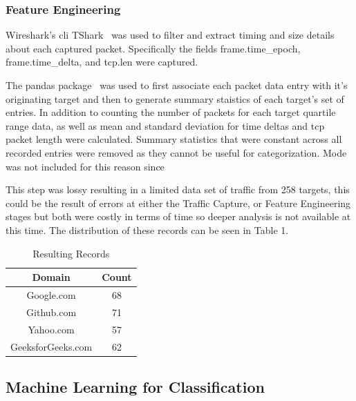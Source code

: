 \documentclass[10pt,sigconf,letterpaper,nonacm]{acmart}
\begin{document}
\subsubsection{Feature Engineering} Wireshark's cli TShark~\cite{Wireshark} was used to
filter and extract timing and size details about each captured packet. Specifically the
fields frame.time\_epoch, frame.time\_delta, and tcp.len were captured.
\par The pandas package~\cite{pandas} was used to first associate each packet data entry
with it's originating target and then to generate summary staistics of each target's set
of entries. In addition to counting the number of packets for each target quartile range
data, as well as mean and standard deviation for time deltas and tcp packet length were
calculated. Summary statistics that were constant across all recorded entries were
removed as they cannot be useful for categorization. Mode was not included for this reason since
\par This step was lossy resulting in a limited data set of traffic from 258 targets, this
could be the result of errors at either the Traffic Capture, or Feature Engineering
stages but both were costly in terms of time so deeper analysis is not available at this
time. The distribution of these records can be seen in Table 1.

\begin{table}
  \caption{Resulting Records}
  \begin{tabular}{cc}
    Domain & Count \\
    \midrule
    Google.com & 68\\
    Github.com & 71\\
    Yahoo.com & 57\\
    GeeksforGeeks.com & 62
  \end{tabular}
\end{table}

\subsection{Machine Learning for Classification}
\end{document}
